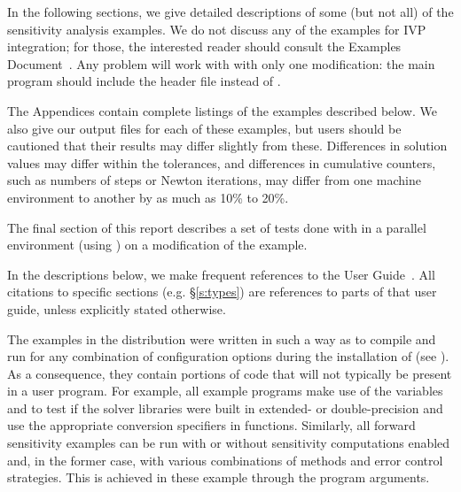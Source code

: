 \vspace{0.2in}\noindent 
In the following sections, we give detailed descriptions of some (but
not all) of the sensitivity analysis examples. We do not discuss any of the 
examples for IVP integration; for those, the interested reader should consult
the {\cvode} Examples Document~\cite{cvode2.4.0_ex}. Any {\cvode} problem
will work with {\cvodes} with only one modification: the main program
should include the header file  instead of .

The Appendices contain complete listings
of the examples described below.  We also give our output files for
each of these examples, but users should be cautioned that their
results may differ slightly from these.  Differences in solution
values may differ within the tolerances, and differences in cumulative
counters, such as numbers of steps or Newton iterations, may differ
from one machine environment to another by as much as 10\% to 20\%.

The final section of this report describes a set of tests done with
{\cvodes} in a parallel environment (using {\nvecp}) on a modification of
the  example.

In the descriptions below, we make frequent references to the {\cvodes}
User Guide~\cite{cvodes2.3.0_ug}.  All citations to specific sections
(e.g. \S\ref{s:types}) are references to parts of that user guide, unless
explicitly stated otherwise.

\vspace{0.2in}
The examples in the {\cvodes} distribution were written in such a way as
to compile and run for any combination of configuration options during
the installation of {\sundials} (see ). As a consequence,
they contain portions of code that will not typically be present in a
user program. For example, all example programs make use of the
variables  and 
to test if the solver libraries
were built in extended- or double-precision and use the appropriate conversion 
specifiers in  functions. Similarly, all forward sensitivity
examples can be run with or without sensitivity computations enabled and,
in the former case, with various combinations of methods and error control 
strategies. This is achieved in these example through the program arguments.

